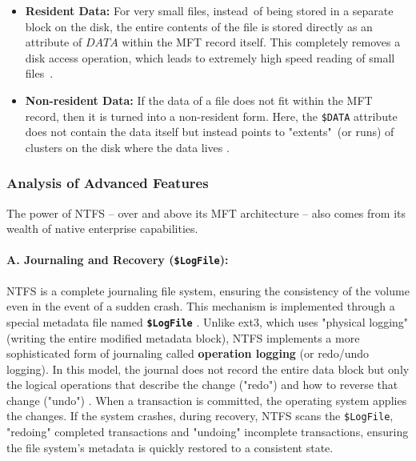 \documentclass[12pt]{article}
\begin{document}
\begin{itemize}
    \item \textbf{Resident Data:} For very small files, instead of being stored in a separate block on the disk, the entire contents of the file is stored directly as an attribute of $DATA$ within the MFT record itself. This completely removes a disk access operation, which leads to extremely high speed reading of small files \parencite{CIRCL2023}.
    
    \item \textbf{Non-resident Data:} If the data of a file does not fit within the MFT record, then it is turned into a non-resident form. Here, the \texttt{\$DATA} attribute does not contain the data itself but instead points to "extents" (or runs) of clusters on the disk where the data lives \parencite{HarvardCS161Journaling}.
\end{itemize}

\subsubsection{Analysis of Advanced Features}
The power of NTFS – over and above its MFT architecture – also comes from its wealth of native enterprise capabilities.

\paragraph{A. Journaling and Recovery (\texttt{\$LogFile}):}
NTFS is a complete journaling file system, ensuring the consistency of the volume even in the event of a sudden crash. This mechanism is implemented through a special metadata file named \textbf{\texttt{\$LogFile}} \parencite{Shafiei2012}. Unlike ext3, which uses "physical logging" (writing the entire modified metadata block), NTFS implements a more sophisticated form of journaling called \textbf{operation logging} (or redo/undo logging). In this model, the journal does not record the entire data block but only the logical operations that describe the change ("redo") and how to reverse that change ("undo") \parencite{HarvardCS161Journaling}. When a transaction is committed, the operating system applies the changes. If the system crashes, during recovery, NTFS scans the \texttt{\$LogFile}, "redoing" completed transactions and "undoing" incomplete transactions, ensuring the file system's metadata is quickly restored to a consistent state.
\end{document}
